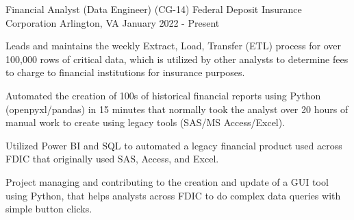 


\begin{cventries}


\cventry
{Financial Analyst (Data Engineer) (CG-14)} %
{Federal Deposit Insurance Corporation} %
{Arlington, VA} %
{January 2022 - Present} %
{ %
\begin{cvitems}
\item {Leads and maintains the weekly Extract, Load, Transfer (ETL) process for over 100,000 rows of critical data, which is utilized by other analysts to determine fees to charge to financial institutions for insurance purposes.}
\item {Automated the creation of 100s of historical financial reports using Python (openpyxl/pandas) in 15 minutes that normally took the analyst over 20 hours of manual work to create using legacy tools (SAS/MS Access/Excel).}
\item {Utilized Power BI and SQL to automated a legacy financial product used across FDIC that originally used SAS, Access, and Excel.}
\item {Project managing and contributing to the creation and update of a GUI tool using Python, that helps analysts across FDIC to do complex data queries with simple button clicks.}

\end{cvitems}}
\end{cventries}
